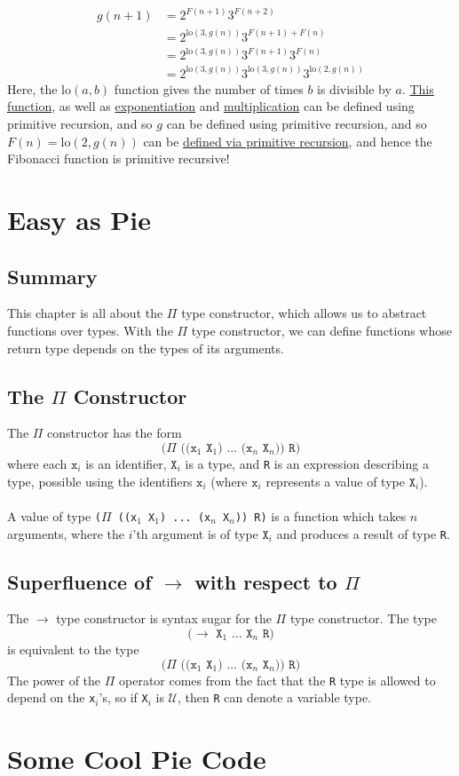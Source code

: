 \documentclass{article}
\newcommand{\ttt}[1]{\texttt{#1}}
\newcommand{\lo}{\mathrm{lo}}
\begin{document}
\begin{itemize}
\begin{align*}
            g(n + 1) &= 2^{F(n + 1)}3^{F(n + 2)} \\
                     &= 2^{\lo(3, g(n))}3^{F(n + 1) + F(n)} \\
                     &= 2^{\lo(3, g(n))}3^{F(n + 1)} 3^{F(n)} \\
                     &= 2^{\lo(3, g(n))}3^{\lo(3, g(n))} 3^{\lo(2, g(n))}
        \end{align*}
        Here, the \(\lo(a, b)\) function gives the number of times \(b\) is divisible by \(a\). \hyperref[code:lo]{This function}, as well as \hyperref[code:exponentiation]{exponentiation} and \hyperref[code:multiplication]{multiplication} can be defined using primitive recursion, and so \(g\) can be defined using primitive recursion, and so \(F(n) = \lo(2, g(n))\) can be \hyperref[code:Fibonacci]{defined via primitive recursion}, and hence the Fibonacci function is primitive recursive!  
\end{itemize}
\section{Easy as Pie}
\subsection{Summary}
This chapter is all about the \(\Pi\) type constructor, which allows us to abstract functions over types. With the \(\Pi\) type constructor, we can define functions whose return type depends on the types of its arguments. 
\subsection{The \(\Pi\) Constructor}
The \(\Pi\) constructor has the form \[
    \ttt{(\(\Pi\) ((x\(_1\) X\(_1\)) ... (x\(_n\) X\(_n\))) R)}
\]
where each \(\ttt{x}_i\) is an identifier, \(\ttt{X}_i\) is a type, and \ttt{R} is an expression describing a type, possible using the identifiers \(\ttt{x}_i\) (where \(\ttt{x}_i\) represents a value of type \(\ttt{X}_i\)).
\\ \\
A value of type \ttt{(\(\Pi\) ((x\(_1\) X\(_1\)) ... (x\(_n\) X\(_n\))) R)} is a function which takes \(n\) arguments, where the \(i\)'th argument is of type \(\ttt{X}_i\) and produces a result of type \ttt{R}.
\subsection{Superfluence of \(\to\) with respect to \(\Pi\)}
The \(\to\) type constructor is syntax sugar for the \(\Pi\) type constructor. The type \[
    \ttt{(\(\to\) X\(_1\) ... X\(_n\) R)}
\] is equivalent to the type \[
    \ttt{(\(\Pi\) ((x\(_1\) X\(_1\)) ... (x\(_n\) X\(_n\))) R)}
\]
The power of the \(\Pi\) operator comes from the fact that the \ttt{R} type is allowed to depend on the \ttt{x}\(_i\)'s, so if \ttt{X}\(_i\) is \(\mathcal{U}\), then \ttt{R} can denote a variable type.
\appendix
\section{Some Cool Pie Code} \label{pie-code-appendix}

\end{document}
